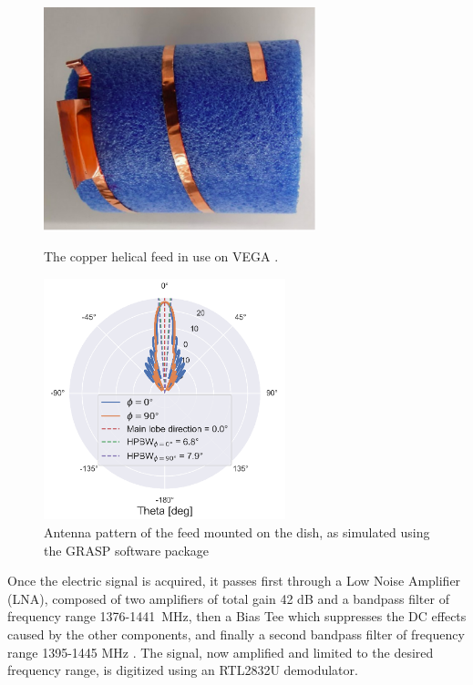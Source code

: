 \begin{figure}[htbp]
    \begin{minipage}[t]{0.5\textwidth}
        \centering
        \captionsetup{width=.9\textwidth}
        \includegraphics[height=6.5cm]{figures/antenna_photo.png}
        \caption{The copper helical feed in use on VEGA \cite{rapport_interne_2024}.}
        \label{fig:antenna_photo}
    \end{minipage}
    \begin{minipage}[t]{0.5\textwidth}
        \centering
        \captionsetup{width=.9\textwidth}
        \includegraphics[height=7cm]{figures/antenna_pattern.png}
        \caption{Antenna pattern of the feed mounted on the dish, as simulated using the GRASP software package \cite{rapport_interne_2024}}
        \label{fig:antenna_pattern}
    \end{minipage}
\end{figure}

Once the electric signal is acquired, it passes first through a Low Noise Amplifier (LNA), composed of two amplifiers of total gain 42 dB and a bandpass filter of frequency range \mbox{1376-1441 MHz}, then a Bias Tee which suppresses the DC effects caused by the other components, and finally a second bandpass filter of frequency range 1395-1445 MHz \cite{interdisciplinary_project_2022}.
The signal, now amplified and limited to the desired frequency range, is digitized using an RTL2832U demodulator. 

